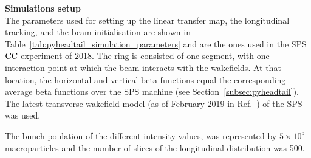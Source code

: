 \textbf{Simulations setup}\\
The parameters used for setting up the linear transfer map, the longitudinal tracking, and the beam initialisation are shown in Table~\ref{tab:pyheadtail_simulation_parameters} and are the ones used in the SPS ${\mathrm{CC}}$ experiment of 2018. The ring is consisted of one segment, with one interaction point at which the beam interacts with the wakefields. At that location, the horizontal and vertical beta functions equal the corresponding average beta functions over the SPS machine (see Section~\ref{subsec:pyheadtail}). The latest transverse wakefield model (as of February 2019 in Ref.~\cite{sps_impedance_model_git}) of the SPS was used.

The bunch poulation of the different intensity values, was represented by $5 \times 10^5$ macroparticles and the number of slices of the longitudinal distribution was 500.

